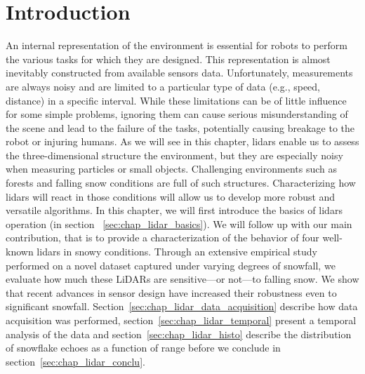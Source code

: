 \section{Introduction}
\label{sec:chap_lidar_intro}

An internal representation of the environment is essential for robots to perform the various tasks for which they are designed. This representation is almost inevitably constructed from available sensors data. Unfortunately, measurements are always noisy and are limited to a particular type of data (e.g., speed, distance) in a specific interval. While these limitations can be of little influence for some simple problems, ignoring them can cause serious misunderstanding of the scene and lead to the failure of the tasks, potentially causing breakage to the robot or injuring humans. As we will see in this chapter, \gls{lidar}s enable us to assess the three-dimensional structure the environment, but they are especially noisy when measuring particles or small objects. Challenging environments such as forests and falling snow conditions are full of such structures. Characterizing how \gls{lidar}s will react in those conditions will allow us to develop more robust and versatile algorithms. In this chapter, we will first introduce the basics of \gls{lidar}s operation (in section ~\ref{sec:chap_lidar_basics}). We will follow up with our main contribution, that is to provide a characterization of the behavior of four well-known \gls{lidar}s in snowy conditions. Through an extensive empirical study performed on a novel dataset captured under varying degrees of snowfall, we evaluate how much these LiDARs are sensitive---or not---to falling snow. We show that recent advances in sensor design have increased their robustness even to significant snowfall. Section~\ref{sec:chap_lidar_data_acquisition} describe how data acquisition was performed, section~\ref{sec:chap_lidar_temporal} present a temporal analysis of the data and section~\ref{sec:chap_lidar_histo} describe the distribution of snowflake echoes as a function of range before we conclude in section~\ref{sec:chap_lidar_conclu}. 

